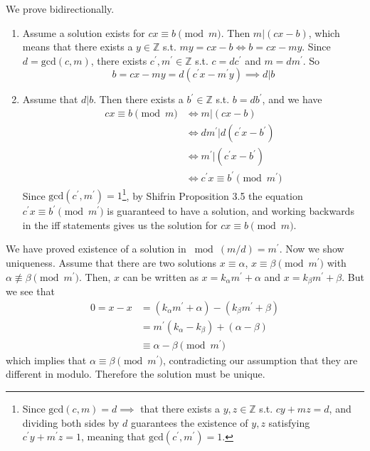   \begin{exercise}[Shifrin 1.3.25]
    We prove bidirectionally. 
    \begin{enumerate}
      \item Assume a solution exists for $cx \equiv b \pmod{m}$. Then $m | (cx - b)$, which means that there exists a $y \in \mathbb{Z}$ s.t. $my = cx - b \iff b = cx - my$. Since $d = \mathrm{gcd}(c, m)$, there exists $c^\prime, m^\prime \in \mathbb{Z}$ s.t. $c = d c^\prime$ and $m = d m^\prime$. So 
      \begin{equation}
        b = cx - my = d (c^\prime x - m^\prime y) \implies d | b
      \end{equation} 

    \item Assume that $d | b$. Then there exists a $b^\prime \in \mathbb{Z}$ s.t. $b = d b^\prime$, and we have 
    \begin{align}
      cx \equiv b \pmod{m} & \iff m | (cx - b) \\
                           & \iff d m^\prime | d (c^\prime x - b^\prime) \\
                           & \iff m^\prime | (c^\prime x - b^\prime) \\
                           & \iff c^\prime x \equiv b^\prime \pmod{m^\prime} 
    \end{align}
    Since $\mathrm{gcd}(c^\prime, m^\prime) = 1$\footnote{Since $\mathrm{gcd}(c, m) = d \implies$ that there exists a $y, z \in \mathbb{Z}$ s.t. $c y + m z = d$, and dividing both sides by $d$ guarantees the existence of $y, z$ satisfying $c^\prime y + m^\prime z = 1$, meaning that $\mathrm{gcd}(c^\prime, m^\prime) = 1$.}, by Shifrin Proposition 3.5 the equation $c^\prime x \equiv b^\prime \pmod{m^\prime}$ is guaranteed to have a solution, and working backwards in the iff statements gives us the solution for $cx \equiv b \pmod{m}$. 
    \end{enumerate}

    We have proved existence of a solution in $\bmod{(m/d) = m^\prime}$. Now we show uniqueness. Assume that there are two solutions $x \equiv \alpha$, $x \equiv \beta \pmod{m^\prime}$ with $\alpha \not\equiv \beta \pmod{m^\prime}$. Then, $x$ can be written as $x = k_\alpha m^\prime + \alpha$ and $x = k_\beta m^\prime + \beta$. But we see that 
    \begin{align}
      0 = x - x & = (k_\alpha m^\prime + \alpha) - (k_\beta m^\prime + \beta) \\
                & = m^\prime (k_\alpha - k_\beta) + (\alpha - \beta) \\
                & \equiv \alpha - \beta \pmod{m^\prime}
    \end{align}
    which implies that $\alpha \equiv \beta \pmod{m^\prime}$, contradicting our assumption that they are different in modulo. Therefore the solution must be unique. 
  \end{exercise}

